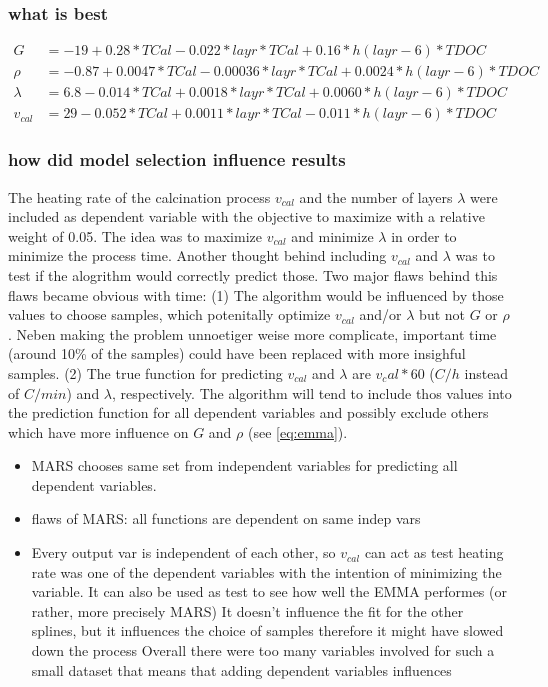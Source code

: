 \subsubsection{what is best}
\begin{align}
    G &=      -19 + 0.28 * TCal  - 0.022 * layr*TCal  +  0.16 * h(layr-6)*TDOC \\
    \rho &=  -0.87 + 0.0047 * TCal  - 0.00036 * layr*TCal  +  0.0024 * h(layr-6)*TDOC \\
    \lambda &=  6.8 - 0.014 * TCal  + 0.0018 * layr*TCal  + 0.0060 * h(layr-6)*TDOC \\
    v_{cal} &= 29 - 0.052 * TCal  + 0.0011 * layr*TCal  -  0.011 * h(layr-6)*TDOC 
    \label{eq:emma}
\end{align}

\subsubsection{how did model selection influence results}
The heating rate of the calcination process $v_{cal}$ and the number of layers $\lambda$ were included as dependent variable with the objective to maximize with a relative weight of 0.05.
The idea was to maximize $v_{cal}$ and minimize $\lambda$ in order to minimize the process time. 
Another thought behind including $v_{cal}$ and $\lambda$ was to test if the alogrithm would correctly predict those. 
Two major flaws behind this flaws became obvious with time: 
(1) The algorithm would be influenced by those values to choose samples, which potenitally optimize $v_{cal}$ and/or $\lambda$ but not $G$ or $\rho$. 
Neben making the problem unnoetiger weise more complicate, important time (around 10\% of the samples) could have been replaced with more insighful samples. 
(2) The true function for predicting $v_{cal}$ and $\lambda$ are $v_cal*60$ ($C/h$ instead of $C/min$) and $\lambda$, respectively. 
The algorithm will tend to include thos values into the prediction function for all dependent variables and possibly exclude others which have more influence on $G$ and $\rho$ (see \ref{eq:emma}).
\begin{itemize}
    \item MARS chooses same set from independent variables for predicting all dependent variables. 
    \item flaws of MARS: all functions are dependent on same indep vars
    \item Every output var is independent of each other, so $v_{cal}$ can act as test 
heating rate was one of the dependent variables with the intention of minimizing the variable. 
It can also be used as test to see how well the EMMA performes (or rather, more precisely MARS)
It doesn't influence the fit for the other splines, but it influences the choice of samples therefore it might have slowed down the process
Overall there were too many variables involved for such a small dataset
        that means that adding dependent variables influences 
\end{itemize}

